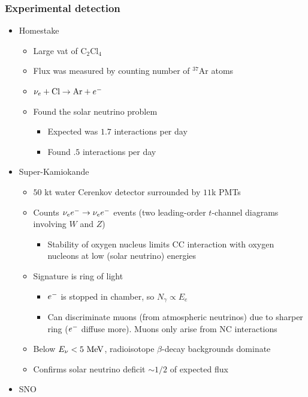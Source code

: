 \subsubsection{Experimental detection}
\begin{itemize}
  \item Homestake
  \begin{itemize}
    \item Large vat of $\text{C}_2\text{Cl}_4$
    \item Flux was measured by counting number of $^{37}\text{Ar}$ atoms
    \item $\nu_e+\text{Cl}\rightarrow \text{Ar}+e^{-}$
    \item Found the solar neutrino problem
    \begin{itemize}
      \item Expected was $1.7$ interactions per day
      \item Found $.5$ interactions per day
    \end{itemize}
  \end{itemize}
  \item Super-Kamiokande
  \begin{itemize}
    \item $50$ kt water Cerenkov detector surrounded by $11$k PMTs
    \item Counts $\nu_ee^{-}\rightarrow\nu_ee^{-}$ events (two leading-order $t$-channel diagrams involving $W$ and $Z$)
    \begin{itemize}
      \item Stability of oxygen nucleus limits CC interaction with oxygen nucleons at low (solar neutrino) energies
    \end{itemize}
    \item Signature is ring of light
    \begin{itemize}
      \item $e^{-}$ is stopped in chamber, so $N_\gamma \propto E_e$
      \item Can discriminate muons (from atmospheric neutrinos) due to sharper ring ($e^{-}$ diffuse more). Muons only arise from NC interactions
    \end{itemize}
    \item Below $E_\nu < 5~\text{MeV}$, radioisotope $\beta$-decay backgrounds dominate
    \item Confirms solar neutrino deficit $\sim1/2$ of expected flux
  \end{itemize}
  \item SNO
  \begin{itemize}

\end{itemize}
\end{itemize}
